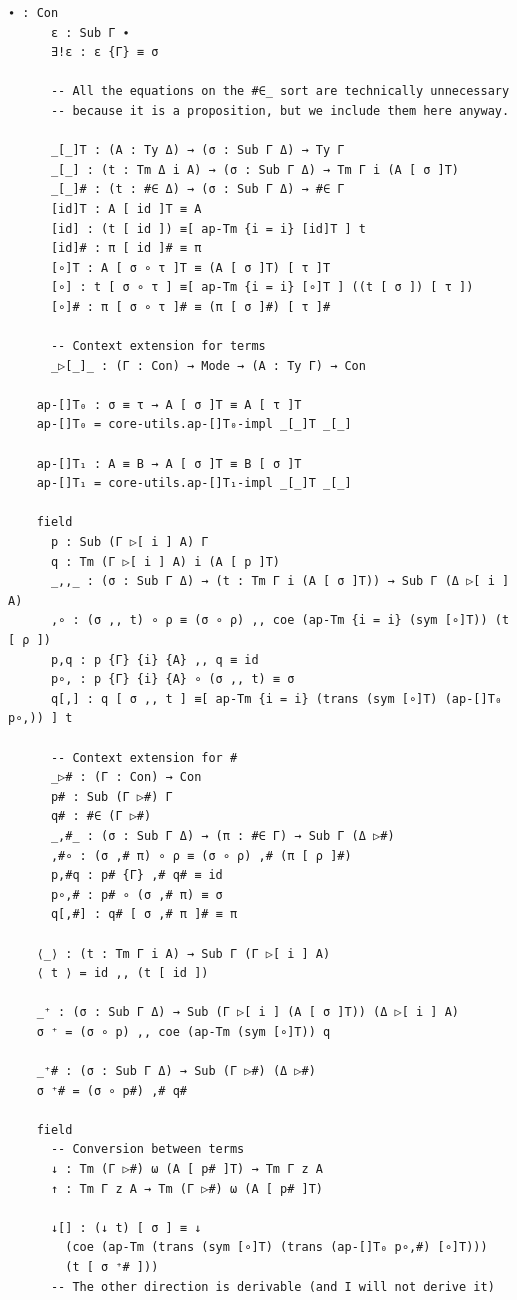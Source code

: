 {\begin{Verbatim}[breaklines=true,breakanywhere=true,fontsize=\scriptsize]
      ∙ : Con
      ε : Sub Γ ∙
      ∃!ε : ε {Γ} ≡ σ

      -- All the equations on the #∈_ sort are technically unnecessary
      -- because it is a proposition, but we include them here anyway.

      _[_]T : (A : Ty Δ) → (σ : Sub Γ Δ) → Ty Γ
      _[_] : (t : Tm Δ i A) → (σ : Sub Γ Δ) → Tm Γ i (A [ σ ]T)
      _[_]# : (t : #∈ Δ) → (σ : Sub Γ Δ) → #∈ Γ
      [id]T : A [ id ]T ≡ A
      [id] : (t [ id ]) ≡[ ap-Tm {i = i} [id]T ] t
      [id]# : π [ id ]# ≡ π 
      [∘]T : A [ σ ∘ τ ]T ≡ (A [ σ ]T) [ τ ]T
      [∘] : t [ σ ∘ τ ] ≡[ ap-Tm {i = i} [∘]T ] ((t [ σ ]) [ τ ])
      [∘]# : π [ σ ∘ τ ]# ≡ (π [ σ ]#) [ τ ]#
      
      -- Context extension for terms
      _▷[_]_ : (Γ : Con) → Mode → (A : Ty Γ) → Con

    ap-[]T₀ : σ ≡ τ → A [ σ ]T ≡ A [ τ ]T
    ap-[]T₀ = core-utils.ap-[]T₀-impl _[_]T _[_]

    ap-[]T₁ : A ≡ B → A [ σ ]T ≡ B [ σ ]T
    ap-[]T₁ = core-utils.ap-[]T₁-impl _[_]T _[_]

    field
      p : Sub (Γ ▷[ i ] A) Γ
      q : Tm (Γ ▷[ i ] A) i (A [ p ]T)
      _,,_ : (σ : Sub Γ Δ) → (t : Tm Γ i (A [ σ ]T)) → Sub Γ (Δ ▷[ i ] A)
      ,∘ : (σ ,, t) ∘ ρ ≡ (σ ∘ ρ) ,, coe (ap-Tm {i = i} (sym [∘]T)) (t [ ρ ])
      p,q : p {Γ} {i} {A} ,, q ≡ id
      p∘, : p {Γ} {i} {A} ∘ (σ ,, t) ≡ σ
      q[,] : q [ σ ,, t ] ≡[ ap-Tm {i = i} (trans (sym [∘]T) (ap-[]T₀ p∘,)) ] t

      -- Context extension for #
      _▷# : (Γ : Con) → Con
      p# : Sub (Γ ▷#) Γ
      q# : #∈ (Γ ▷#)
      _,#_ : (σ : Sub Γ Δ) → (π : #∈ Γ) → Sub Γ (Δ ▷#)
      ,#∘ : (σ ,# π) ∘ ρ ≡ (σ ∘ ρ) ,# (π [ ρ ]#)
      p,#q : p# {Γ} ,# q# ≡ id
      p∘,# : p# ∘ (σ ,# π) ≡ σ
      q[,#] : q# [ σ ,# π ]# ≡ π

    ⟨_⟩ : (t : Tm Γ i A) → Sub Γ (Γ ▷[ i ] A)
    ⟨ t ⟩ = id ,, (t [ id ])

    _⁺ : (σ : Sub Γ Δ) → Sub (Γ ▷[ i ] (A [ σ ]T)) (Δ ▷[ i ] A)
    σ ⁺ = (σ ∘ p) ,, coe (ap-Tm (sym [∘]T)) q

    _⁺# : (σ : Sub Γ Δ) → Sub (Γ ▷#) (Δ ▷#)
    σ ⁺# = (σ ∘ p#) ,# q#
        
    field
      -- Conversion between terms
      ↓ : Tm (Γ ▷#) ω (A [ p# ]T) → Tm Γ z A
      ↑ : Tm Γ z A → Tm (Γ ▷#) ω (A [ p# ]T)

      ↓[] : (↓ t) [ σ ] ≡ ↓
        (coe (ap-Tm (trans (sym [∘]T) (trans (ap-[]T₀ p∘,#) [∘]T)))
        (t [ σ ⁺# ]))  
      -- The other direction is derivable (and I will not derive it)


\end{Verbatim}}
